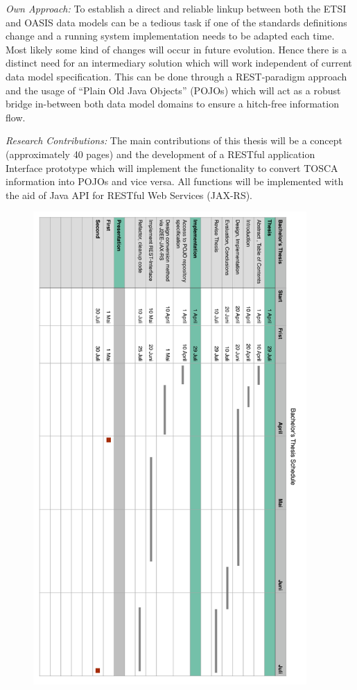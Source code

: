 \textit{Own Approach:}
To establish a direct and reliable linkup between both the ETSI and OASIS data models can be a tedious task if one of the standards definitions change and a running system implementation needs to be adapted each time. Most likely some kind of changes will occur in future evolution. Hence there is a distinct need for an intermediary solution which will work independent of current data model specification. This can be done through a REST-paradigm approach and the usage of “Plain Old Java Objects” (POJOs) which will act as a robust bridge in-between both data model domains to ensure a hitch-free information flow.

\textit{Research Contributions:}
The main contributions of this thesis will be a concept (approximately 40 pages) and the development of a RESTful application Interface prototype which will implement the functionality to convert  TOSCA information into POJOs and vice versa. All functions will be implemented with the aid of Java API for RESTful Web Services (JAX-RS).

\newpage


\begin{figure}
	\centering
		\includegraphics[width=0.93\textwidth]{resources/images/schedule.png}
	\label{fig:schedule}
\end{figure}



